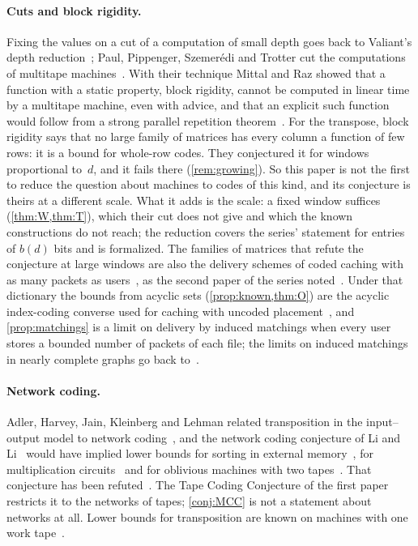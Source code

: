 \paragraph{Cuts and block rigidity.} Fixing the values on a cut of a computation of small depth goes back to Valiant's
depth reduction~\cite{Valiant1977}; Paul, Pippenger, Szemer\'edi and Trotter cut the computations of multitape
machines~\cite{PPST1983}. With their technique Mittal and Raz showed that a function with a static property, block
rigidity, cannot be computed in linear time by a multitape machine, even with advice, and that an explicit such
function would follow from a strong parallel repetition theorem~\cite{MittalRaz2021}. For the transpose, block
rigidity says that no large family of matrices has every column a function of few rows: it is a bound for whole-row
codes. They conjectured it for windows proportional to~$d$, and it fails there (\cref{rem:growing}). So this paper
is not the first to reduce the question about machines to codes of this kind, and its conjecture is theirs at a
different scale. What it adds is the scale: a fixed window suffices (\cref{thm:W,thm:T}), which their cut does not
give and which the known constructions do not reach; the reduction covers the series' statement for entries of
$b(d)$ bits and is formalized. The families of matrices that refute the conjecture at large windows are also the
delivery schemes of coded caching with as many packets as users~\cite{YanEtAl2017,ShanmugamEtAl2017}, as the second
paper of the series noted~\cite{SecondPaper2026}. Under that dictionary the bounds from acyclic sets
(\cref{prop:known,thm:O}) are the acyclic index-coding converse used for caching with uncoded
placement~\cite[Lemma~1]{WanTuninettiPiantanida2020}, and \cref{prop:matchings} is a limit on delivery by
induced matchings when every user stores a bounded number of packets of each file; the limits on induced matchings
in nearly complete graphs go back to~\cite[Section~3]{AMS2013}.

\paragraph{Network coding.} Adler, Harvey, Jain, Kleinberg and Lehman related transposition in the input--output
model to network coding~\cite{AHJKL2006}, and the network coding conjecture of Li and Li~\cite{LiLi2004} would have
implied lower bounds for sorting in external memory~\cite{FHLS2019}, for multiplication
circuits~\cite{AFKL2019} and for oblivious machines with two tapes~\cite{AHJKL2006}. That conjecture has been
refuted~\cite{BravermanHe2026,ZhangLiLi2026}. The Tape Coding Conjecture of the first paper restricts it to the
networks of tapes; \cref{conj:MCC} is not a statement about networks at all. Lower bounds for transposition are known
on machines with one work tape~\cite{DMS1991,DietzfelbingerMaass1993}.

